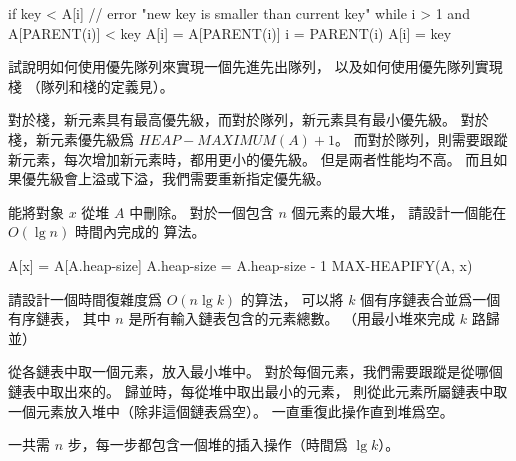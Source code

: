 \startANSWER
{}
\startCLRSCODE
if key < A[i]
	// error "new key is smaller than current key"
while i > 1 and A[PARENT(i)] < key
	A[i] = A[PARENT(i)]
	i = PARENT(i)
A[i] = key
\stopCLRSCODE
\stopANSWER

\startEXERCISE
試說明如何使用優先隊列來實現一個先進先出隊列，
以及如何使用優先隊列實現棧
（隊列和棧的定義見）。
\stopEXERCISE

\startANSWER
對於棧，新元素具有最高優先級，而對於隊列，新元素具有最小優先級。
對於棧，新元素優先級爲 $HEAP-MAXIMUM(A) + 1$。
而對於隊列，則需要跟蹤新元素，每次增加新元素時，都用更小的優先級。
但是兩者性能均不高。
而且如果優先級會上溢或下溢，我們需要重新指定優先級。
\stopANSWER

\startEXERCISE
{} 能將對象 $x$ 從堆 $A$ 中刪除。
對於一個包含 $n$ 個元素的最大堆，
請設計一個能在 $O(\lg{n})$ 時間內完成的  算法。
\stopEXERCISE

\startANSWER
{}
\startCLRSCODE
A[x] = A[A.heap-size]
A.heap-size = A.heap-size - 1
MAX-HEAPIFY(A, x)
\stopCLRSCODE
\stopANSWER

請設計一個時間復雜度爲 $O(n\lg{k})$ 的算法，
可以將 $k$ 個有序鏈表合並爲一個有序鏈表，
其中 $n$ 是所有輸入鏈表包含的元素總數。
（\hint 用最小堆來完成 $k$ 路歸並）
\stopEXERCISE

\startANSWER
從各鏈表中取一個元素，放入最小堆中。
對於每個元素，我們需要跟蹤是從哪個鏈表中取出來的。
歸並時，每從堆中取出最小的元素，
則從此元素所屬鏈表中取一個元素放入堆中（除非這個鏈表爲空）。
一直重復此操作直到堆爲空。

一共需 $n$ 步，每一步都包含一個堆的插入操作（時間爲 $\lg{k}$）。
\stopANSWER

\stopsection
